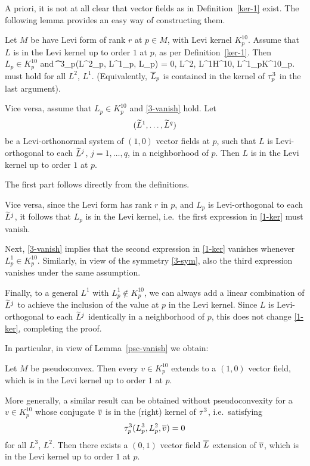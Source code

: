 \documentclass[12pt]{amsart}
\begin{document}
A priori, it is not at all clear
that vector fields as in Definition~\ref{ker-1} exist.
The following lemma
provides an easy way of constructing them.


\bl{}
Let $M$ be have Levi form of rank $r$ at $p\in M$,
with Levi kernel $K^{10}_p$.
Assume that $L$ is in the Levi kernel
up to order $1$ at $p$,
as per Definition~\ref{ker-1}.
Then $L_p\in K^{10}_p$ and
\beq{}
	\t^3_p(L^2_p, L^1_p, \1L_p) 
	= 0, 
	\quad L^2, L^1\in H^{10}, 
	\quad L^1_p\in K^{10}_p.
\eeq
must hold for all $L^2$, $L^1$.
(Equivalently, $\overline{L}_p$ is contained in the kernel of $\tau^3_p$ in the last argument).

Vice versa, assume that $L_p\in K^{10}_p$ and 
\eqref{3-vanish} hold.
Let
$$(\widetilde{L}^1, \ldots, \widetilde{L}^q)$$
be a Levi-orthonormal system of 
$(1,0)$ vector fields at $p$,
such that $L$ is Levi-orthogonal to each $\widetilde{L}^j$, $j=1,\ldots,q$,
in a neighborhood of $p$.
Then $L$ is in the Levi kernel up to order $1$ at $p$.
\el


\bpf
The first part follows directly from the definitions.

Vice versa, since the Levi form has rank $r$ in $p$,
and $L_p$ is Levi-orthogonal to each $\widetilde{L}^j$,
it follows that $L_p$ is in the Levi kernel, i.e.\
the first expression in \eqref{1-ker} must vanish.

Next, \eqref{3-vanish}
implies that the second expression in \eqref{1-ker}
vanishes whenever $L^1_p\in K^{10}_p$.
Similarly, in view of the symmetry \eqref{3-sym},
also the third expression vanishes
under the same assumption.

Finally, to a general $L^1$ with $L^1_p\notin K^{10}_p$,
we can always add a linear combination of $\widetilde{L}^j$
to achieve the inclusion of the value at $p$ in the Levi kernel.
Since $L$ is Levi-orthogonal to each $\widetilde{L}^j$ identically in a neighborhood of $p$,
this does not change \eqref{1-ker},
completing the proof.
\epf

In particular, in view of Lemma~\ref{psc-vanish} we obtain:

\bc{}
Let $M$ be pseudoconvex.
Then every $v\in K^{10}_p$
extends to a $(1,0)$ vector field,
which is in the Levi kernel up to order $1$ at $p$.
\ec

\br
More generally, a similar result
can be obtained without pseudoconvexity
for a $v\in K^{10}_p$ 
whose conjugate $\overline{v}$ is in the (right) kernel of $\tau^3$, 
i.e.\ satisfying 
$$
	\tau^3_p(L^3_p, L^2_p, \overline{v}) = 0
$$
for all $L^3$, $L^2$.
Then there exists a $(0,1)$ vector field $\overline{L}$ extension of  $\overline{v}$,
which is in the Levi kernel up to order $1$ at $p$.
\er
\end{document}
